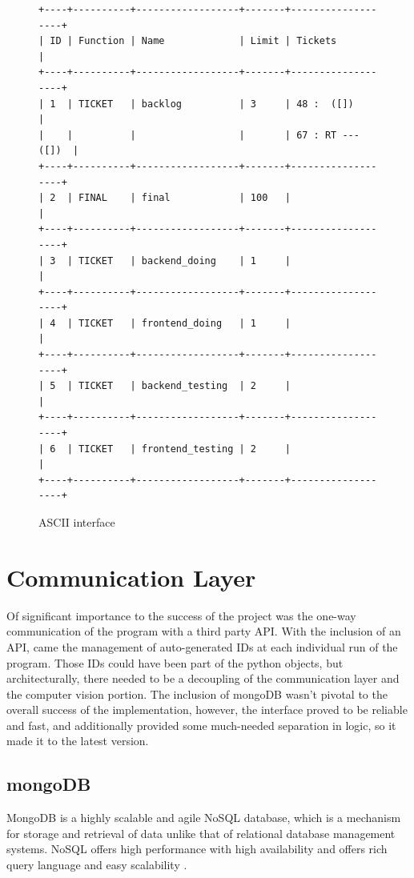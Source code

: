 \documentclass[12pt]{report}
\theoremstyle{definition}
\theoremstyle{remark}
\begin{document}
\begin{figure}[h]
\begin{verbatim}
+----+----------+------------------+-------+-------------------+
| ID | Function | Name             | Limit | Tickets           |
+----+----------+------------------+-------+-------------------+
| 1  | TICKET   | backlog          | 3     | 48 :  ([])        |
|    |          |                  |       | 67 : RT --- ([])  |
+----+----------+------------------+-------+-------------------+
| 2  | FINAL    | final            | 100   |                   |
+----+----------+------------------+-------+-------------------+
| 3  | TICKET   | backend_doing    | 1     |                   |
+----+----------+------------------+-------+-------------------+
| 4  | TICKET   | frontend_doing   | 1     |                   |
+----+----------+------------------+-------+-------------------+
| 5  | TICKET   | backend_testing  | 2     |                   |
+----+----------+------------------+-------+-------------------+
| 6  | TICKET   | frontend_testing | 2     |                   |
+----+----------+------------------+-------+-------------------+
\end{verbatim}
\caption{ASCII interface}
\label{fig:ascii}
\end{figure}

\chapter{Communication Layer}
Of significant importance to the success of the project was the one-way communication of the program with a third party API. With the inclusion of an API, came the management of auto-generated IDs at each individual run of the program. Those IDs could have been part of the python objects, but architecturally, there needed to be a decoupling of the communication layer and the computer vision portion. The inclusion of mongoDB wasn't pivotal to the overall success of the implementation, however, the interface proved to be reliable and fast, and additionally provided some much-needed separation in logic, so it made it to the latest version.

\section{mongoDB}
MongoDB is a highly scalable and agile NoSQL database, which is a mechanism for storage and retrieval of data unlike that of relational database management systems. NoSQL offers high performance with high availability and offers rich query language and easy scalability \cite{nosql}.
\end{document}
